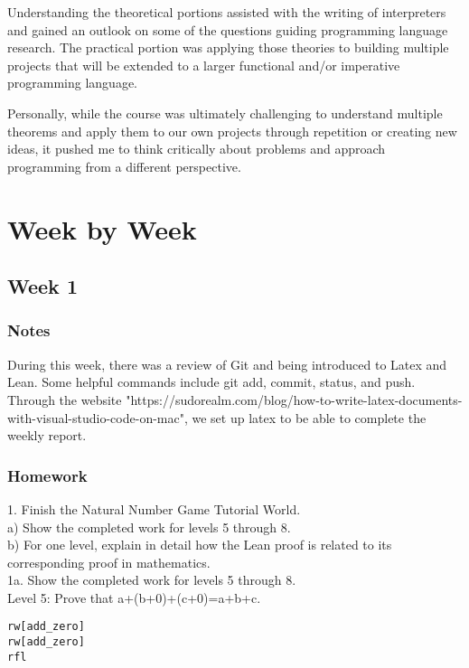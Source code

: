 \documentclass{article}
\theoremstyle{theorem}
\theoremstyle{definition}
\theoremstyle{remark}
\begin{document}
Understanding the theoretical portions assisted with the writing of interpreters and gained an outlook 
on some of the questions guiding programming language research. The practical portion was applying those 
theories to building multiple projects that will be extended to a larger functional and/or imperative 
programming language.

Personally, while the course was ultimately challenging to understand multiple theorems and apply 
them to our own projects through repetition or creating new ideas, it pushed me to think critically 
about problems and approach programming from a different perspective.

\section{Week by Week}\label{homework}

\subsection{Week 1}

\subsubsection{Notes}

During this week, there was a review of Git and being introduced to Latex and Lean. Some helpful commands include git add, commit, status, and push. 
Through the website "https://sudorealm.com/blog/how-to-write-latex-documents-with-visual-studio-code-on-mac", we set up latex to be able to complete the weekly report.

\subsubsection{Homework} 

1. Finish the Natural Number Game Tutorial World. \\
\hspace*{2em}a) Show the completed work for levels 5 through 8. \\
\hspace*{2em}b) For one level, explain in detail how the Lean proof is related to its corresponding proof in mathematics. \\

1a. Show the completed work for levels 5 through 8. \\
Level 5: Prove that a+(b+0)+(c+0)=a+b+c.
\begin{lstlisting}
rw[add_zero]
rw[add_zero]
rfl
\end{lstlisting}
\end{document}
